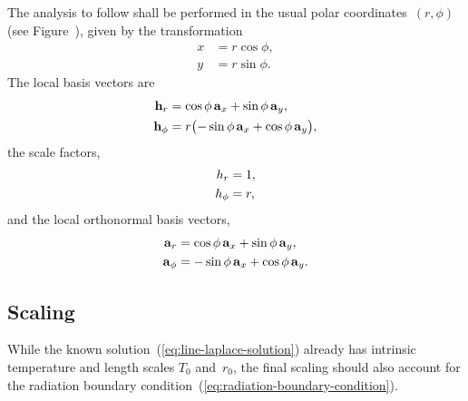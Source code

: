 The analysis to follow shall be performed
in the usual polar coordinates~$(r, \phi)$
(see Figure~\tbd),
given by the transformation
\begin{align}
  x &= r \cos\phi, \label{eq:polar-x-transformation} \\
  y &= r \sin\phi. \label{eq:polar-y-transformation}
\end{align}
The local basis vectors are
\begin{align}
  \localvec{r} &=
    \cos\phi \basisvec{x} + \sin\phi \basisvec{y},
    \label{eq:r-local-basis-vector} \\
  \localvec{\phi} &=
    r \roundbr[\big]{-\sin\phi \basisvec{x} + \cos\phi \basisvec{y}},
    \label{eq:phi-local-basis-vector}
\end{align}
the scale factors,
\begin{align}
  \scalefac[r] &= 1, \label{eq:r-scale-factor} \\
  \scalefac[\phi] &= r, \label{eq:phi-scale-factor}
\end{align}
and the local orthonormal basis vectors,
\begin{align}
  \basisvec{r} &= \cos\phi \basisvec{x} + \sin\phi \basisvec{y},
    \label{eq:r-basis-vector} \\
  \basisvec{\phi} &= -\sin\phi \basisvec{x} + \cos\phi \basisvec{y}.
    \label{eq:phi-basis-vector}
\end{align}

\subsection{Scaling}
\label{sec:polar.line.scaling}

While the known solution~(\ref{eq:line-laplace-solution})
already has intrinsic temperature and length scales $T_0$ and~$r_0$,
the final scaling should also account for
the radiation boundary condition~(\ref{eq:radiation-boundary-condition}).

